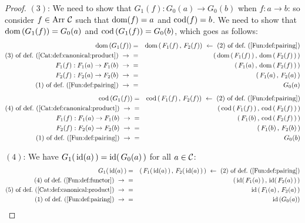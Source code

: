 \begin{proof}
    $(3)$: We need to show that $G_{1}(f):G_{0}(a)\to G_{0}(b)$ when
    $f:a\to b$: so consider $f\in\mbox{\rm Arr}\ \mbox{$\cal C$}$ such that $\mbox{\rm dom}(f)=a$ and 
    $\mbox{\rm cod}(f)=b$. We need to show that $\mbox{\rm dom}\,(G_{1}(f))=G_{0}(a)$
    and $\mbox{\rm cod}\,(G_{1}(f))=G_{0}(b)$, which goes as follows:
        \begin{eqnarray*}\dom\,(G_{1}(f))
            &=&\dom\,(\,F_{1}(f)\,,\,F_{2}(f))\ \leftarrow \
            \mbox{$(2)$ of def.~(\ref{Fun:def:pairing})}\\
            \mbox{$(3)$ of def.~(\ref{Cat:def:canonical:product})}\ \to\ 
            &=&(\,\dom\,(\,F_{1}(f)\,)\,,\,\dom\,(\,F_{2}(f)\,)\,)\\
            F_{1}(f):F_{1}(a)\to F_{1}(b)\ \to\ 
            &=&(\,F_{1}(a)\,,\,\dom\,(\,F_{2}(f)\,)\,)\\
            F_{2}(f):F_{2}(a)\to F_{2}(b)\ \to\ 
            &=&(\,F_{1}(a)\,,\,F_{2}(a)\,)\\
            \mbox{$(1)$ of def.~(\ref{Fun:def:pairing})}\ \to\ 
            &=&G_{0}(a)
        \end{eqnarray*}
        \begin{eqnarray*}\cod\,(G_{1}(f))
            &=&\cod\,(\,F_{1}(f)\,,\,F_{2}(f))\ \leftarrow\ 
            \mbox{$(2)$ of def.~(\ref{Fun:def:pairing})}\\
            \mbox{$(4)$ of def.~(\ref{Cat:def:canonical:product})}\ \to\ 
            &=&(\,\cod\,(\,F_{1}(f)\,)\,,\,\cod\,(\,F_{2}(f)\,)\,)\\
            F_{1}(f):F_{1}(a)\to F_{1}(b)\ \to\ 
            &=&(\,F_{1}(b)\,,\,\cod\,(\,F_{2}(f)\,)\,)\\
            F_{2}(f):F_{2}(a)\to F_{2}(b)\ \to\ 
            &=&(\,F_{1}(b)\,,\,F_{2}(b)\,)\\
            \mbox{$(1)$ of def.~(\ref{Fun:def:pairing})}\ \to\ 
            &=&G_{0}(b)
        \end{eqnarray*}

    $(4)$: We have $G_{1}(\,\mbox{\rm id}(a)\,)=\mbox{\rm id}(\,G_{0}(a)\,)$ for all $a\in\mbox{$\cal C$}$:
        \begin{eqnarray*}G_{1}(\,\id(a)\,)
            &=&(\,F_{1}(\,\id(a)\,)\,,\,F_{2}(\,\id(a)\,)\,)\ \leftarrow\ 
            \mbox{$(2)$ of def.~(\ref{Fun:def:pairing})}\\
            \mbox{$(4)$ of def.~(\ref{Fun:def:functor})}\ \to\ 
            &=&(\,\id(\,F_{1}(a)\,)\,,\,\id(\,F_{2}(a)\,)\,)\\
            \mbox{$(5)$ of def.~(\ref{Cat:def:canonical:product})}\ \to\ 
            &=&\id\,(\,F_{1}(a)\,,\,F_{2}(a)\,)\\
            \mbox{$(1)$ of def.~(\ref{Fun:def:pairing})}\ \to\ 
            &=&\id\,(G_{0}(a))
        \end{eqnarray*}


\end{proof}
